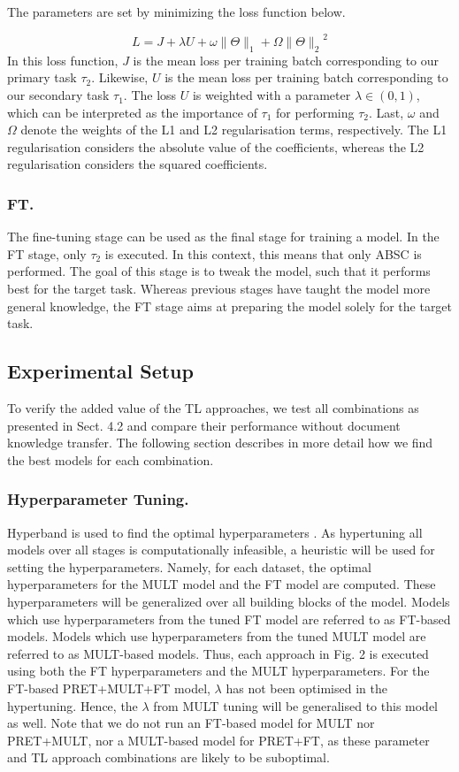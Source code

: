 \documentclass[runningheads]{llncs}
\begin{document}
The parameters are set by minimizing the loss function below.

\begin{equation}
    L = J + \lambda U + \omega \|\Theta\|_1 + \Omega  {\|\Theta\|_2}^2
\end{equation}
In this loss function, $J$ is the mean loss per training batch corresponding to our primary task $\tau_2$. Likewise, $U$ is the mean loss per training batch corresponding to our secondary task $\tau_1$. The loss $U$ is weighted with a parameter $\lambda \in (0,1)$, which can be interpreted as the importance of $\tau_1$ for performing $\tau_2$. Last, $\omega$ and $\Omega$ denote the weights of the L1 and L2 regularisation terms, respectively. The L1 regularisation considers the absolute value of the coefficients, whereas the L2 regularisation considers the squared coefficients. 

\subsubsection{FT.}
The fine-tuning stage can be used as the final stage for training a model. In the FT stage, only $\tau_2$ is executed. In this context, this means that only ABSC is performed. The goal of this stage is to tweak the model, such that it performs best for the target task. Whereas previous stages have taught the model more general knowledge, the FT stage aims at preparing the model solely for the target task.

\subsection{Experimental Setup}
To verify the added value of the TL approaches, we test all combinations as presented in Sect. 4.2 and compare their performance without document knowledge transfer. The following section describes in more detail how we find the best models for each combination.

\subsubsection*{Hyperparameter Tuning.}

Hyperband is used to find the optimal hyperparameters \cite{Li2018}. As hypertuning all models over all stages is computationally infeasible, a heuristic  will be used for setting the hyperparameters. Namely, for each dataset, the optimal hyperparameters for the MULT model and the FT model are computed. These hyperparameters will be generalized over all building blocks of the model. Models which use hyperparameters from the tuned FT model are referred to as FT-based models. Models which use hyperparameters from the tuned MULT model are referred to as MULT-based models. Thus, each approach in Fig. 2 is executed using both the FT hyperparameters and the MULT hyperparameters. For the FT-based PRET+MULT+FT model, $\lambda$ has not been optimised in the hypertuning. Hence, the $\lambda$ from MULT tuning will be generalised to this model as well. Note that we do not run an FT-based model for MULT nor PRET+MULT, nor a MULT-based model for PRET+FT, as these parameter and TL approach combinations are likely to be suboptimal. 
\end{document}
